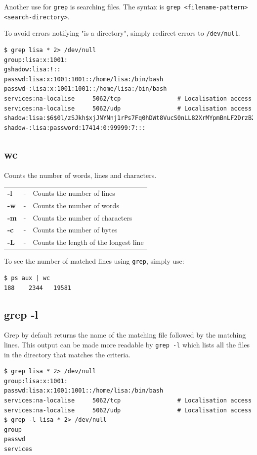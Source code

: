 \noindent
Another use for \verb|grep| is searching files. The syntax is \verb|grep <filename-pattern> <search-directory>|.

To avoid errors notifying "is a directory", simply redirect errors to \verb|/dev/null|.

\begin{verbatim}
$ grep lisa * 2> /dev/null
group:lisa:x:1001:
gshadow:lisa:!::
passwd:lisa:x:1001:1001::/home/lisa:/bin/bash
passwd-:lisa:x:1001:1001::/home/lisa:/bin/bash
services:na-localise     5062/tcp                # Localisation access
services:na-localise     5062/udp                # Localisation access
shadow:lisa:$6$0l/zSJkh$xjJNYNnj1rPs7Fq0hDWt8VucS0nLL82XrMYpmBnLF2DrzB2npFvCwxM9MJEHgCHCwvabCgEA17LK2aU0h9FIT/:17414:0:99999:7:::
shadow-:lisa:password:17414:0:99999:7:::
\end{verbatim}

\subsection{wc}
Counts the number of words, lines and characters. 

\begin{tabular}{lcl}
	\textbf{-l} &- &Counts the number of lines \\
	\textbf{-w} &- &Counts the number of words \\
	\textbf{-m} &- &Counts the number of characters \\
	\textbf{-c} &- &Counts the number of bytes \\
	\textbf{-L} &- &Counts the length of the longest line \\
\end{tabular}

To see the number of matched lines using \verb|grep|, simply use:

\begin{verbatim}
$ ps aux | wc
188    2344   19581
\end{verbatim}

\subsection{grep -l}
Grep by default returns the name of the matching file followed by the matching lines. This output can be made more readable by \verb|grep -l| which lists all the files in the directory that matches the criteria.

\begin{verbatim}
$ grep lisa * 2> /dev/null
group:lisa:x:1001:
passwd:lisa:x:1001:1001::/home/lisa:/bin/bash
services:na-localise     5062/tcp                # Localisation access
services:na-localise     5062/udp                # Localisation access
$ grep -l lisa * 2> /dev/null
group
passwd
services
\end{verbatim}

